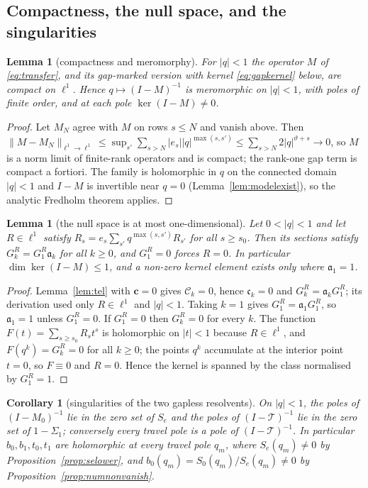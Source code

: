 \documentclass[11pt]{article}
\theoremstyle{plain}
\newtheorem{lemma}[theorem]{Lemma}
\newtheorem{corollary}[theorem]{Corollary}
\theoremstyle{definition}
\theoremstyle{remark}
\begin{document}
\subsection{Compactness, the null space, and the singularities}\label{sec:fred}

\begin{lemma}[compactness and meromorphy]\label{lem:fred}
For $|q|<1$ the operator $M$ of \eqref{eq:transfer}, and its gap-marked version with kernel
\eqref{eq:gapkernel} below, are compact on $\ell^1$. Hence $q\mapsto(I-M)^{-1}$ is meromorphic on
$|q|<1$, with poles of finite order, and at each pole $\ker(I-M)\ne0$.
\end{lemma}

\begin{proof}
Let $M_N$ agree with $M$ on rows $s\le N$ and vanish above. Then
$\|M-M_N\|_{\ell^1\to\ell^1}\le\sup_{s'}\sum_{s>N}|e_s||q|^{\max(s,s')}
\le\sum_{s>N}2|q|^{\vartheta+s}\to0$, so $M$ is a norm limit of finite-rank operators and is
compact; the rank-one gap term is compact a fortiori. The family is holomorphic in $q$ on the
connected domain $|q|<1$ and $I-M$ is invertible near $q=0$ (Lemma~\ref{lem:modelexist}), so the
analytic Fredholm theorem applies.
\end{proof}

\begin{lemma}[the null space is at most one-dimensional]\label{lem:nullspace}
Let $0<|q|<1$ and let $R\in\ell^1$ satisfy $R_s=e_s\sum_{s'}q^{\max(s,s')}R_{s'}$ for all
$s\ge s_0$. Then its sections satisfy $G^R_k=G^R_1\mathfrak a_k$ for all $k\ge0$, and $G^R_1=0$
forces $R=0$. In particular $\dim\ker(I-M)\le1$, and a non-zero kernel element exists only where
$\mathfrak a_1=1$.
\end{lemma}

\begin{proof}
Lemma~\ref{lem:tel} with $\mathbf c=0$ gives $\mathcal C_k=0$, hence $\mathfrak c_k=0$ and
$G^R_k=\mathfrak a_kG^R_1$; its derivation used only $R\in\ell^1$ and $|q|<1$. Taking $k=1$ gives
$G^R_1=\mathfrak a_1G^R_1$, so $\mathfrak a_1=1$ unless $G^R_1=0$. If $G^R_1=0$ then $G^R_k=0$ for
every $k$. The function $F(t)=\sum_{s\ge s_0}R_st^s$ is holomorphic on $|t|<1$ because
$R\in\ell^1$, and $F(q^k)=G^R_k=0$ for all $k\ge0$; the points $q^k$ accumulate at the interior
point $t=0$, so $F\equiv0$ and $R=0$. Hence the kernel is spanned by the class normalised by
$G^R_1=1$.
\end{proof}

\begin{corollary}[singularities of the two gapless resolvents]\label{cor:sing}
On $|q|<1$, the poles of $(I-M_0)^{-1}$ lie in the zero set of $S_e$ and the poles of
$(I-\mathcal T)^{-1}$ lie in the zero set of $1-\Sigma_1$; conversely every travel pole is a pole
of $(I-\mathcal T)^{-1}$.
In particular $b_0,b_1,t_0,t_1$ are holomorphic at every travel pole $q_m$, where $S_e(q_m)\ne0$
by Proposition~\ref{prop:selower}, and $b_0(q_m)=S_0(q_m)/S_e(q_m)\ne0$ by
Proposition~\ref{prop:numnonvanish}.
\end{corollary}
\end{document}
